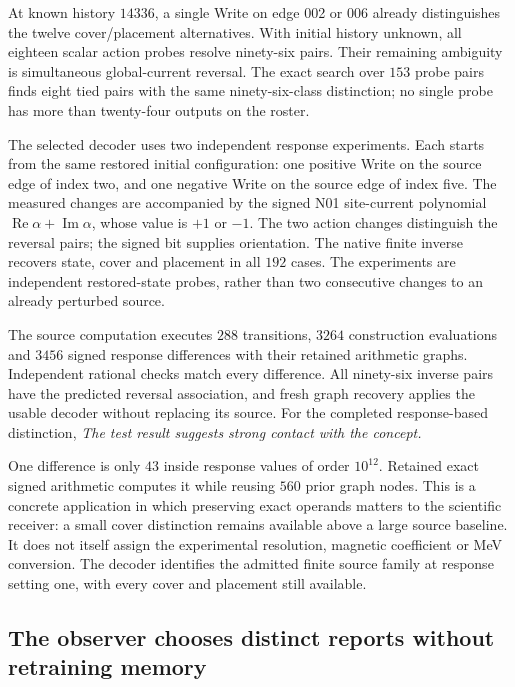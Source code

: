 At known history $14336$, a single Write on edge 002 or 006 already distinguishes the twelve cover/placement alternatives. With initial history unknown, all eighteen scalar action probes resolve ninety-six pairs. Their remaining ambiguity is simultaneous global-current reversal. The exact search over $153$ probe pairs finds eight tied pairs with the same ninety-six-class distinction; no single probe has more than twenty-four outputs on the roster.

The selected decoder uses two independent response experiments. Each starts from the same restored initial configuration: one positive Write on the source edge of index two, and one negative Write on the source edge of index five. The measured changes are accompanied by the signed N01 site-current polynomial $\operatorname{Re}\alpha+\operatorname{Im}\alpha$, whose value is $+1$ or $-1$. The two action changes distinguish the reversal pairs; the signed bit supplies orientation. The native finite inverse recovers state, cover and placement in all $192$ cases. The experiments are independent restored-state probes, rather than two consecutive changes to an already perturbed source.

The source computation executes $288$ transitions, $3264$ construction evaluations and $3456$ signed response differences with their retained arithmetic graphs. Independent rational checks match every difference. All ninety-six inverse pairs have the predicted reversal association, and fresh graph recovery applies the usable decoder without replacing its source. For the completed response-based distinction, \emph{The test result suggests strong contact with the concept.}

One difference is only $43$ inside response values of order $10^{12}$. Retained exact signed arithmetic computes it while reusing $560$ prior graph nodes. This is a concrete application in which preserving exact operands matters to the scientific receiver: a small cover distinction remains available above a large source baseline. It does not itself assign the experimental resolution, magnetic coefficient or MeV conversion. The decoder identifies the admitted finite source family at response setting one, with every cover and placement still available.

\subsection{The observer chooses distinct reports without retraining memory}

